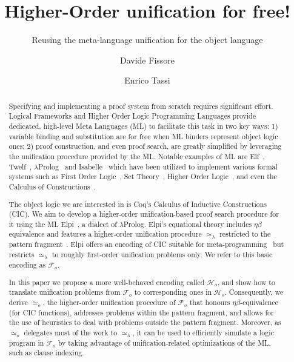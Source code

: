 \documentclass[sigconf,natbib=false,review]{acmart}
\newcommand{\UnifRel}{\ensuremath{\simeq}}
\newcommand{\Uo}{\texorpdfstring{\ensuremath{\UnifRel_o}\xspace}{unif\_o}}
\newcommand{\Ue}{\ensuremath{\UnifRel_\lambda}\xspace}
\newcommand{\Fo}{\texorpdfstring{\ensuremath{\mathcal{F}_{\!o}\xspace}}{Fo}} %
\newcommand{\Ho}{\texorpdfstring{\ensuremath{\mathcal{H}_o}\xspace}{Ho}}
\begin{document}
\title{Higher-Order unification for free!}
\subtitle{Reusing the meta-language unification for the object language}

\author{Davide Fissore}

\author{Enrico Tassi}

\begin{abstract}
  Specifying and implementing a proof system from scratch requires significant effort.
  Logical Frameworks and Higher Order Logic Programming Languages provide
  dedicated, high-level Meta Languages (ML) to facilitate this task in two
  key ways: 1) variable binding and substitution are for free when ML binders
  represent object logic ones; 2) proof construction, and even proof search, are
  greatly simplified by leveraging the unification procedure provided by the ML.
  Notable examples of ML are Elf~\cite{elf}, Twelf~\cite{twelf},
  $\lambda$Prolog~\cite{miller_nadathur_2012} and
  Isabelle~\cite{10.1007/978-3-540-71067-7_7}
  which have been utilized to implement various formal systems such as
  First Order Logic~\cite{felty88cade},
  Set Theory~\cite{10.1007/BF00881873},
  Higher Order Logic~\cite{books/sp/NipkowPW02}, and even the Calculus of
  Constructions~\cite{felty93lics}.

  The object logic we are interested in is
  Coq's Calculus of Inductive Constructions (CIC)\cite{Coq-refman}. We aim to
  develop a higher-order unification-based 
  proof search procedure for it using the ML
  Elpi~\cite{dunchev15lpar}, a dialect of $\lambda$Prolog.
  Elpi's equational theory includes
  $\eta\beta$ equivalence and features a
  higher-order unification procedure \Ue restricted to the pattern
  fragment~\cite{miller92jsc}.
  Elpi offers an encoding of CIC suitable
  for meta-programming~\cite{tassi:hal-01637063,tassi:hal-01897468,gregoire:hal-03800154,newtc}
  but restricts \Ue to roughly first-order unification problems only.
  We refer to this basic encoding as \Fo.
  
  In this paper we propose a more well-behaved encoding called \Ho,
  and show how to translate unification problems from \Fo{}
  to corresponding ones in \Ho.
  Consequently, we derive \Uo{}, the higher-order unification procedure of \Fo{}
    that honours $\eta\beta$-equivalence (for CIC functions), addresses
  problems within the pattern fragment, and allows
  for the use of heuristics to deal with problems outside the
  pattern fragment. Moreover, as \Uo{} delegates most of the work to \Ue,
  it can be used to efficiently simulate a logic program in \Fo{} by
  taking advantage of
  unification-related optimizations of the ML, such as clause indexing.

\end{abstract}
\end{document}
